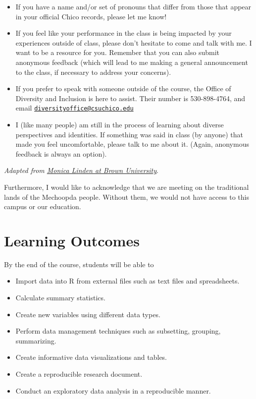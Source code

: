 \documentclass[
  11pt,
]{article}
\providecommand{\tightlist}{%
  \setlength{\itemsep}{0pt}\setlength{\parskip}{0pt}}
\begin{document}
\begin{itemize}
\tightlist
\item
  If you have a name and/or set of pronouns that differ from those that
  appear in your official Chico records, please let me know!
\item
  If you feel like your performance in the class is being impacted by
  your experiences outside of class, please don't hesitate to come and
  talk with me. I want to be a resource for you. Remember that you can
  also submit anonymous feedback (which will lead to me making a general
  announcement to the class, if necessary to address your concerns).
\item
  If you prefer to speak with someone outside of the course, the Office
  of Diversity and Inclusion is here to assist. Their number is
  530-898-4764, and email
  \href{mailto:diversityoffice@csuchico.edu}{\nolinkurl{diversityoffice@csuchico.edu}}
\item
  I (like many people) am still in the process of learning about diverse
  perspectives and identities. If something was said in class (by
  anyone) that made you feel uncomfortable, please talk to me about it.
  (Again, anonymous feedback is always an option).
\end{itemize}

\emph{Adapted from
\href{https://www.brown.edu/sheridan/teaching-learning-resources/inclusive-teaching/statements}{Monica
Linden at Brown University}}.

Furthermore, I would like to acknowledge that we are meeting on the
traditional lands of the Mechoopda people. Without them, we would not
have access to this campus or our education.

\hypertarget{learning-outcomes}{%
\section{Learning Outcomes}\label{learning-outcomes}}

By the end of the course, students will be able to

\begin{itemize}
\tightlist
\item
  Import data into R from external files such as text files and
  spreadsheets.
\item
  Calculate summary statistics.
\item
  Create new variables using different data types.
\item
  Perform data management techniques such as subsetting, grouping,
  summarizing.
\item
  Create informative data visualizations and tables.
\item
  Create a reproducible research document.
\item
  Conduct an exploratory data analysis in a reproducible manner.
\end{itemize}
\end{document}
